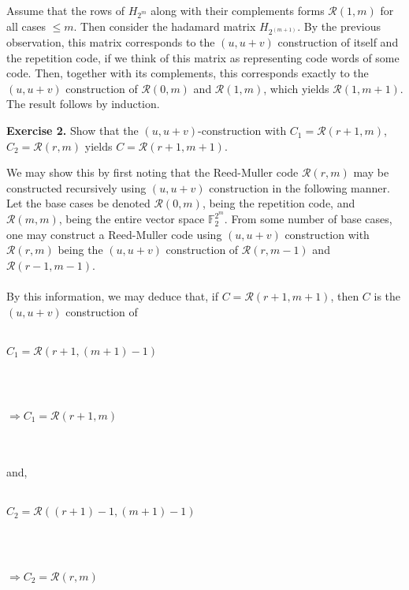 \documentclass[12pt]{article}
\begin{document}
\begin{adjustwidth}{0.5cm}{}
\begin{adjustwidth}{0.5cm}{}
	Assume that the rows of $H_{2^m}$ along with their complements forms $\mathcal{R}(1, m)$ for all cases $\leq m$.  Then consider the hadamard matrix $H_{2^{(m+1)}}$.  By the previous observation, this matrix corresponds to the $(u, u+v)$ construction of itself and the repetition code, if we think of this matrix as representing code words of some code.  Then, together with its complements, this corresponds exactly to the $(u, u+v)$ construction of $\mathcal{R}(0, m)$ and $\mathcal{R}(1, m)$, which yields $\mathcal{R}(1, m+1)$.  The result follows by induction.\\
	\end{adjustwidth}
\end{adjustwidth}

\noindent \textbf{Exercise 2.} Show that the $(u, u+v)$-construction with $C_1 = \mathcal{R}(r+1, m)$, $C_2 = \mathcal{R}(r, m)$ yields $C = \mathcal{R}(r+1, m+1)$.\\
\begin{adjustwidth}{0.5cm}{}
We may show this by first noting that the Reed-Muller code $\mathcal{R}(r, m)$ may be constructed recursively using $(u, u+v)$ construction in the following manner.  Let the base cases be denoted $\mathcal{R}(0, m)$, being the repetition code, and $\mathcal{R}(m, m)$, being the entire vector space $\mathbb{F}_2^{2^m}$.  From some number of base cases, one may construct a Reed-Muller code using $(u, u+v)$ construction with $\mathcal{R}(r, m)$ being the $(u, u+v)$ construction of $\mathcal{R}(r, m-1)$ and $\mathcal{R}(r-1, m-1)$.\\\\
By this information, we may deduce that, if $C = \mathcal{R}(r+1, m+1)$, then $C$ is the $(u, u+v)$ construction of\\\\
	\centerline{$C_1 = \mathcal{R}(r+1, (m+1)-1)$}\\\\
	\centerline{$\Rightarrow C_1 = \mathcal{R}(r+1, m)$}\\\\
and,\\\\
	\centerline{$C_2 = \mathcal{R}((r+1)-1, (m+1)-1)$}\\\\
	\centerline{$\Rightarrow C_2 = \mathcal{R}(r, m)$}\\
\end{adjustwidth}
\end{document}
